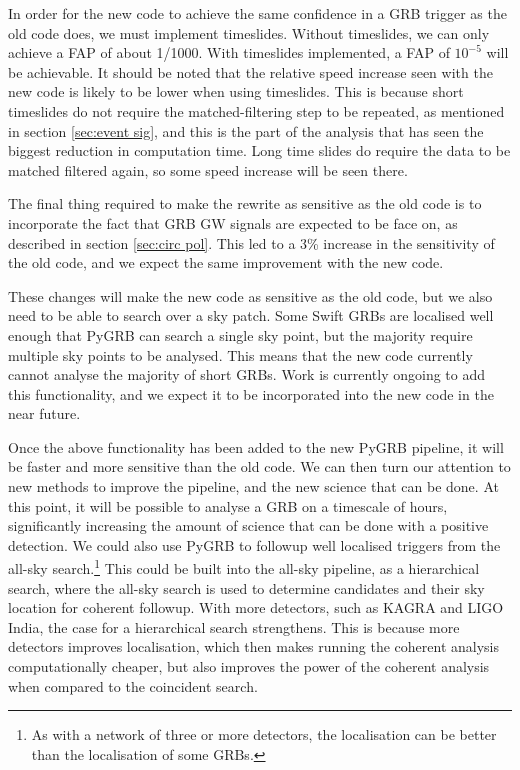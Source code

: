 \documentclass[11pt]{cuthesis}
\begin{document}
In order for the new code to achieve the same confidence in a GRB trigger as the old code does, we must implement timeslides. Without timeslides, we can only achieve a FAP of about 1/1000. With timeslides implemented, a FAP of $10^{-5}$ will be achievable. It should be noted that the relative speed increase seen with the new code is likely to be lower when using timeslides. This is because short timeslides do not require the matched-filtering step to be repeated, as mentioned in section \ref{sec:event sig}, and this is the part of the analysis that has seen the biggest reduction in computation time. Long time slides do require the data to be matched filtered again, so some speed increase will be seen there.

The final thing required to make the rewrite as sensitive as the old code is to incorporate the fact that GRB GW signals are expected to be face on, as described in section \ref{sec:circ pol}. This led to a 3\% increase in the sensitivity of the old code, and we expect the same improvement with the new code. 

These changes will make the new code as sensitive as the old code, but we also need to be able to search over a sky patch. Some Swift GRBs are localised well enough that PyGRB can search a single sky point, but the majority require multiple sky points to be analysed. This means that the new code currently cannot analyse the majority of short GRBs. Work is currently ongoing to add this functionality, and we expect it to be incorporated into the new code in the near future. 

Once the above functionality has been added to the new PyGRB pipeline, it will be faster and more sensitive than the old code. We can then turn our attention to new methods to improve the pipeline, and the new science that can be done. At this point, it will be possible to analyse a GRB on a timescale of hours, significantly increasing the amount of science that can be done with a positive detection. We could also use PyGRB to followup well localised triggers from the all-sky search.\footnote{As with a network of three or more detectors, the localisation can be better than the localisation of some GRBs.} This could be built into the all-sky pipeline, as a hierarchical search, where the all-sky search is used to determine candidates and their sky location for coherent followup. With more detectors, such as KAGRA and LIGO India, the case for a hierarchical search strengthens. This is because more detectors improves localisation, which then makes running the coherent analysis computationally cheaper, but also improves the power of the coherent analysis when compared to the coincident search.
\end{document}
